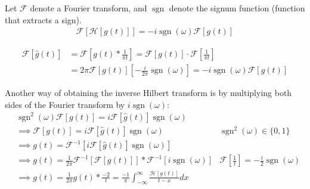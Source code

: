 \documentclass[12pt, english]{book}
\makeatletter
\renewenvironment{proof}[1][\proofname]{\par
	\pushQED{\qed}%
	\normalfont \topsep6\p@\@plus6\p@\relax
	\list{}{%
		\settowidth{\leftmargin}{\itshape\proofname:\hskip\labelsep}%
		\setlength{\labelwidth}{0pt}%
		\setlength{\itemindent}{-\leftmargin}%
		}%
	\item[\hskip\labelsep\itshape#1\@addpunct{:}]\ignorespaces
	}{\popQED\endlist\@endpefalse}
\makeatother
\begin{document}
	\begin{lemma}
		\label{Fourier Transform of Hilbert Transform Lemma - Complex}
		Let \(\mathcal{F}\) denote a Fourier transform, and \(\operatorname{sgn}\) denote the signum function (function that extracts a sign).
		\begin{align*}
			\mathcal{F}[\mathcal{H}[g(t)]] = - i \operatorname{sgn}(\omega) \mathcal{F}[g(t)]
		\end{align*}
	\end{lemma}	
	\begin{proof}
		\begin{align*}
			\mathcal{F}[\hat{g}(t)] 
			 &=  \mathcal{F}\left[g(t) \ast \frac{1}{\pi t}\right] 
			  = \mathcal{F}[g(t)] \cdot \mathcal{F}\left[\frac{1}{\pi t}\right] \\
			 &= 2\pi \mathcal{F}[g(t)] \left[- \frac{i}{2\pi} \operatorname{sgn}(\omega) \right] 
			  = -i \operatorname{sgn}(\omega) \mathcal{F}[g(t)] 
		\end{align*}
	\end{proof}
	
	Another way of obtaining the inverse Hilbert transform  is by multiplying both sides of the Fourier transform by \(i \operatorname{sgn}(\omega)\):
	\begin{align*}
		&\operatorname{sgn}^2(\omega) \mathcal{F}[g(t)] = i \mathcal{F}[\hat{g}(t)] \operatorname{sgn}(\omega) \\
		&\implies \mathcal{F}[g(t)] = i \mathcal{F}[\hat{g}(t)] \operatorname{sgn}(\omega)
			& \operatorname{sgn}^2(\omega) \in \{0, 1\} \\
		&\implies g(t) = \mathcal{F}^{-1}[i\mathcal{F}[\hat{g}(t)] \operatorname{sgn}(\omega)] \\
		&\implies g(t) = \frac{1}{2\pi} \mathcal{F}^{-1}[\mathcal{F}[g(t)]] \ast \mathcal{F}^{-1}[i\operatorname{sgn}(\omega)]
			& \mathcal{F}\left[\frac{1}{t}\right] = - \frac{i}{2}\operatorname{sgn}(\omega) \\
		&\implies g(t) 
			= \frac{1}{2\pi} g(t) \ast \frac{-2}{t} 
			= \frac{-1}{\pi} \int_{-\infty}^{\infty} \frac{\mathcal{H}[g(t)]}{t-x} dx
	\end{align*}
\end{document}
